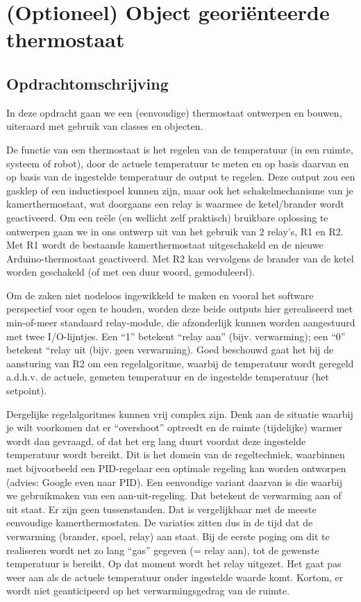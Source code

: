 \chapter{(Optioneel) Object georiënteerde thermostaat}

\section{Opdrachtomschrijving}

In deze opdracht gaan we een (eenvoudige) thermostaat ontwerpen en bouwen, uiteraard met gebruik van classes en objecten. \par
De functie van een thermostaat is het regelen van de temperatuur (in een ruimte, systeem of robot), door de actuele temperatuur te meten en op basis daarvan en op basis van de ingestelde temperatuur de output te regelen. Deze output zou een gasklep of een inductiespoel kunnen zijn, maar ook het schakelmechanisme van je kamerthermostaat, wat doorgaans een relay is waarmee de ketel/brander wordt geactiveerd. Om een reële (en wellicht zelf praktisch) bruikbare oplossing te ontwerpen gaan we in ons ontwerp uit van het gebruik van 2 relay’s, R1 en R2. Met R1 wordt de bestaande kamerthermostaat uitgeschakeld en de nieuwe Arduino-thermostaat geactiveerd. Met R2 kan vervolgens de brander van de ketel worden geschakeld (of met een duur woord, gemoduleerd). \par

Om de zaken niet nodeloos ingewikkeld te maken en vooral het software perspectief voor ogen te houden, worden deze beide outputs hier gerealiseerd met min-of-meer standaard relay-module, die afzonderlijk kunnen worden aangestuurd met twee I/O-lijntjes. Een “1” betekent “relay aan” (bijv. verwarming); een “0” betekent “relay uit (bijv. geen verwarming). Goed beschouwd gaat het bij de aansturing van R2 om een regelalgoritme, waarbij de temperatuur wordt geregeld a.d.h.v. de actuele, gemeten temperatuur en de ingestelde temperatuur (het setpoint).\par
Dergelijke regelalgoritmes kunnen vrij complex zijn. Denk aan de situatie waarbij je wilt voorkomen dat er “overshoot” optreedt en de ruimte (tijdelijke) warmer wordt dan gevraagd, of dat het erg lang duurt voordat deze ingestelde temperatuur wordt bereikt. Dit is het domein van de regeltechniek, waarbinnen met bijvoorbeeld een PID-regelaar een optimale regeling kan worden ontworpen (advies: Google even naar PID). Een eenvoudige variant daarvan is die waarbij we gebruikmaken van een aan-uit-regeling. Dat betekent de verwarming aan of uit staat. Er zijn geen tussenstanden. Dat is vergelijkbaar met de meeste eenvoudige kamerthermostaten. De variaties zitten dus in de tijd dat de verwarming (brander, spoel, relay) aan staat. Bij de eerste poging om dit te realiseren wordt net zo lang “gas” gegeven (= relay aan), tot de gewenste temperatuur is bereikt. Op dat moment wordt het relay uitgezet. Het gaat pas weer aan als de actuele temperatuur onder ingestelde waarde komt. Kortom, er wordt niet geanticipeerd op het verwarmingsgedrag van de ruimte.

